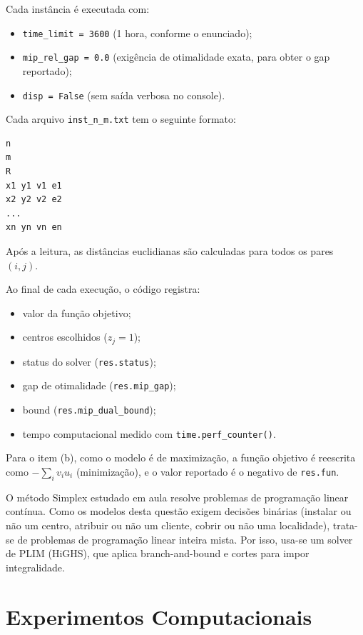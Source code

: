 \documentclass[12pt,a4paper]{article}
\begin{document}
Cada instância é executada com:
\begin{itemize}
    \item \texttt{time\_limit = 3600} (1 hora, conforme o
    enunciado);
    \item \texttt{mip\_rel\_gap = 0.0} (exigência de
    otimalidade exata, para obter o gap reportado);
    \item \texttt{disp = False} (sem saída verbosa no console).
\end{itemize}

Cada arquivo \texttt{inst\_n\_m.txt} tem o seguinte formato:

\begin{verbatim}
n
m
R
x1 y1 v1 e1
x2 y2 v2 e2
...
xn yn vn en
\end{verbatim}

Após a leitura, as distâncias euclidianas são calculadas
para todos os pares $(i,j)$.

Ao final de cada execução, o código registra:
\begin{itemize}
    \item valor da função objetivo;
    \item centros escolhidos ($z_j=1$);
    \item status do solver (\texttt{res.status});
    \item gap de otimalidade (\texttt{res.mip\_gap});
    \item bound (\texttt{res.mip\_dual\_bound});
    \item tempo computacional medido com
    \texttt{time.perf\_counter()}.
\end{itemize}

Para o item (b), como o modelo é de maximização, a função
objetivo é reescrita como $-\sum_i v_i u_i$ (minimização),
e o valor reportado é o negativo de \texttt{res.fun}.

O método Simplex estudado em aula resolve problemas de
programação linear contínua. Como os modelos desta questão
exigem decisões binárias (instalar ou não um centro, atribuir
ou não um cliente, cobrir ou não uma localidade), trata-se
de problemas de programação linear inteira mista. Por isso,
usa-se um solver de PLIM (HiGHS), que aplica branch-and-bound
e cortes para impor integralidade.

\section{Experimentos Computacionais}
\end{document}
